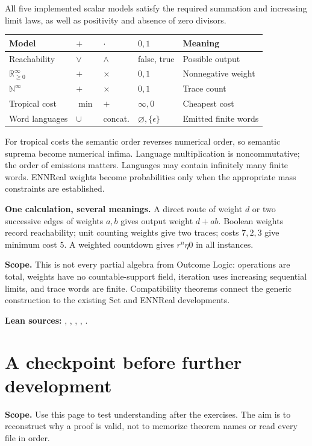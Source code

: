 \documentclass[11pt,a4paper]{article}
\newcommand{\scope}[1]{\textcolor{muted}{\small\textbf{Scope.} #1}\par\medskip}
\newcommand{\nextpage}[2]{\clearpage\section{#1}\scope{#2}}
\newcommand{\pure}{\eta}
\newcommand{\Rge}{\mathbb{R}_{\geq 0}^{\infty}}
\newcommand{\Ninf}{\mathbb{N}^{\infty}}
\begin{document}
All five implemented scalar models satisfy the required summation and increasing
limit laws, as well as positivity and absence of zero divisors.
\begin{center}
\begin{tabularx}{\linewidth}{@{}l l l l X@{}}
\toprule
Model & $+$ & $\cdot$ & $0,1$ & Meaning \\
\midrule
Reachability & $\lor$ & $\land$ & false, true & Possible output \\
$\Rge$ & $+$ & $\times$ & $0,1$ & Nonnegative weight \\
$\Ninf$ & $+$ & $\times$ & $0,1$ & Trace count \\
Tropical cost & $\min$ & $+$ & $\infty,0$ & Cheapest cost \\
Word languages & $\cup$ & concat. & $\varnothing,\{\epsilon\}$ & Emitted finite words \\
\bottomrule
\end{tabularx}
\end{center}
For tropical costs the semantic order reverses numerical order, so semantic
suprema become numerical infima. Language multiplication is noncommutative;
the order of emissions matters. Languages may contain infinitely many finite words.
ENNReal weights become probabilities only when
the appropriate mass constraints are established.

\textbf{One calculation, several meanings.} A direct route of weight $d$ or two
successive edges of weights $a,b$ gives output weight $d+ab$. Boolean weights
record reachability; unit counting weights give two traces; costs $7,2,3$ give
minimum cost $5$. A weighted countdown gives $r^n\pure 0$ in all instances.

\textbf{Scope.} This is not every partial algebra from Outcome Logic: operations
are total, weights have no countable-support field, iteration uses increasing
sequential limits, and trace words are finite. Compatibility theorems connect
the generic construction to the existing Set and ENNReal developments.

{\small\textcolor{muted}{\textbf{Lean sources:}}
, ,
, ,
.}

\nextpage{A checkpoint before further development}{Use this page to test
understanding after the exercises. The aim is to reconstruct why a proof is valid,
not to memorize theorem names or read every file in order.}
\end{document}
